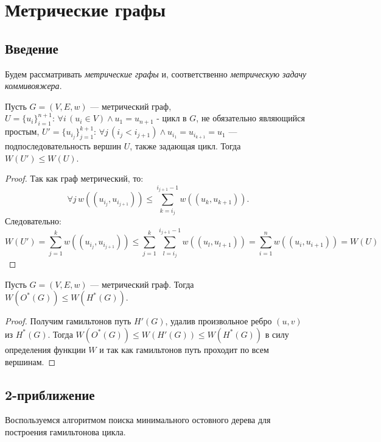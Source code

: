 \section{Метрические графы}

\subsection{Введение}

\begin{agreement}
    Будем рассматривать \textit{метрические графы} и, соответственно \textit{метрическую задачу коммивояжера}.
\end{agreement}

\begin{lemma}
    \label{lemma:2-1}
    Пусть $G = (V, E, w)$ --- метрический граф,
    $U = \{u_i\}_{i=1}^{n+1}: \, \forall i \, (u_i \in V) \wedge u_1 = u_{n+1}$ - цикл в $G$, не обязательно являющийся простым,
    $U' = \{u_{i_j}\}_{j=1}^{k+1}: \, \forall j \, (i_j < i_{j+1}) \wedge u_{i_1} = u_{i_{k+1}} = u_1$ --- подпоследовательность вершин $U$, также задающая цикл.
    Тогда $W(U') \leq W(U)$.
\end{lemma}
\begin{proof}
    Так как граф метрический, то:
    $$\forall j \, w((u_{i_j}, u_{i_{j+1}})) \leq \sum\limits_{k = i_j}^{i_{j+1} - 1} w((u_k, u_{k+1})).$$
    Следовательно:
    $$W(U') = \sum\limits_{j=1}^{k} w((u_{i_j}, u_{i_{j+1}})) \leq \sum\limits_{j=1}^{k} \sum\limits_{l = i_j}^{i_{j+1} - 1} w((u_l, u_{l+1})) =
        \sum\limits_{i = 1}^{n} w((u_i, u_{i+1})) = W(U)$$
\end{proof}

\begin{lemma}
    \label{lemma:2-2}
    Пусть $G = (V, E, w)$ --- метрический граф.
    Тогда $W(O^*(G)) \leq W(H^*(G))$.
\end{lemma}
\begin{proof}
    Получим гамильтонов путь $H'(G)$, удалив произвольное ребро $(u, v)$ из $H^*(G)$.
    Тогда $W(O^*(G)) \leq W(H'(G)) \leq W(H^*(G))$ в силу определения функции $W$ и так как гамильтонов путь проходит по всем вершинам.
\end{proof}

\subsection{2-приближение}
Воспользуемся алгоритмом поиска минимального остовного дерева для построения гамильтонова цикла.

